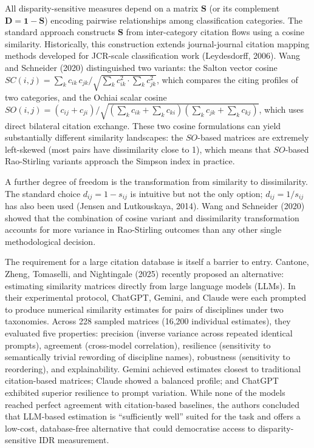 \documentclass[
]{article}
\begin{document}
All disparity-sensitive measures depend on a matrix \(\mathbf{S}\) (or
its complement \(\mathbf{D} = \mathbf{1} - \mathbf{S}\)) encoding
pairwise relationships among classification categories. The standard
approach constructs \(\mathbf{S}\) from inter-category citation flows
using a cosine similarity. Historically, this construction extends
journal-journal citation mapping methods developed for JCR-scale
classification work (Leydesdorff, 2006). Wang and Schneider (2020)
distinguished two variants: the Salton vector cosine
\(SC(i,j) = \sum_k c_{ik}\, c_{jk} / \sqrt{\sum_k c_{ik}^2 \cdot \sum_k c_{jk}^2}\),
which compares the citing profiles of two categories, and the Ochiai
scalar cosine
\(SO(i,j) = (c_{ij} + c_{ji}) / \sqrt{(\sum_k c_{ik} + \sum_k c_{ki})(\sum_k c_{jk} + \sum_k c_{kj})}\),
which uses direct bilateral citation exchange. These two cosine
formulations can yield substantially different similarity landscapes:
the \(SO\)-based matrices are extremely left-skewed (most pairs have
dissimilarity close to 1), which means that \(SO\)-based Rao-Stirling
variants approach the Simpson index in practice.

A further degree of freedom is the transformation from similarity to
dissimilarity. The standard choice \(d_{ij} = 1 - s_{ij}\) is intuitive
but not the only option; \(d_{ij} = 1/s_{ij}\) has also been used
(Jensen and Lutkouskaya, 2014). Wang and Schneider (2020) showed that
the combination of cosine variant and dissimilarity transformation
accounts for more variance in Rao-Stirling outcomes than any other
single methodological decision.

The requirement for a large citation database is itself a barrier to
entry. Cantone, Zheng, Tomaselli, and Nightingale (2025) recently
proposed an alternative: estimating similarity matrices directly from
large language models (LLMs). In their experimental protocol, ChatGPT,
Gemini, and Claude were each prompted to produce numerical similarity
estimates for pairs of disciplines under two taxonomies. Across 228
sampled matrices (16,200 individual estimates), they evaluated five
properties: precision (inverse variance across repeated identical
prompts), agreement (cross-model correlation), resilience (sensitivity
to semantically trivial rewording of discipline names), robustness
(sensitivity to reordering), and explainability. Gemini achieved
estimates closest to traditional citation-based matrices; Claude showed
a balanced profile; and ChatGPT exhibited superior resilience to prompt
variation. While none of the models reached perfect agreement with
citation-based baselines, the authors concluded that LLM-based
estimation is ``sufficiently well'' suited for the task and offers a
low-cost, database-free alternative that could democratise access to
disparity-sensitive IDR measurement.
\end{document}

